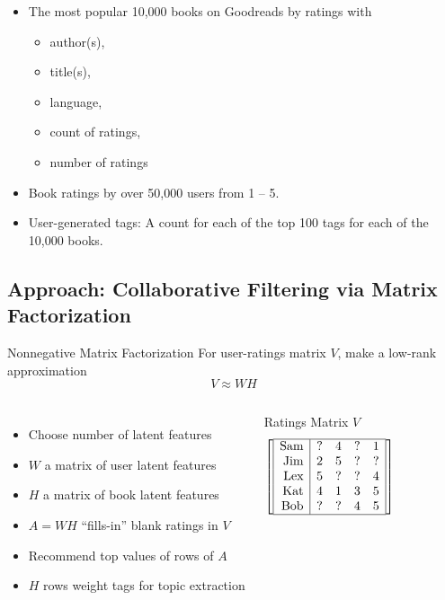 \documentclass[handout]{beamer}
\begin{document}
\begin{frame}

\begin{itemize}[<+->]
\item The most popular 10,000 books on Goodreads by ratings with
\begin{itemize}[<+->]
\item author(s),
\item title(s),
\item language,
\item count of ratings, 
\item number of ratings
\end{itemize}
\vfill
\item Book ratings by over 50,000 users from 1 -- 5.
\vfill
\item User-generated tags: A count for each of the top 100 tags for each of the 10,000 books.
\end{itemize}

\end{frame}


\subsection{Approach: Collaborative Filtering via Matrix Factorization}\label{approach}

\begin{frame}
\begin{block}{Nonnegative Matrix Factorization}
\setlength\abovedisplayskip{0pt}
For user-ratings matrix $V$, make a low-rank approximation
\[ V \approx WH\]
\end{block}
\vfill

\begin{columns}
\begin{itemize}[<+->]
\item Choose number of latent features
\item $W$ a matrix of user latent features
\item $H$ a matrix of book latent features
\item %
$A =WH$ ``fills-in'' blank ratings in $V$
\item Recommend top values of rows of $A$
\item $H$ rows weight tags for topic extraction
\end{itemize}
\begin{block}{Ratings Matrix $V$}
\centering
\[\left[\begin{array}{|r|cccc|}\hline
\text{Sam} & ? & 4 & ? & 1 \\
\text{Jim} & 2 & 5 & ? & ? \\
\text{Lex} & 5 & ? & ? & 4 \\
\text{Kat} & 4 & 1 & 3 & 5 \\
\text{Bob} & ? & ? & 4 & 5 \\\hline
\end{array}\right]\]
\end{block}
\end{columns}
\end{frame}
\end{document}
